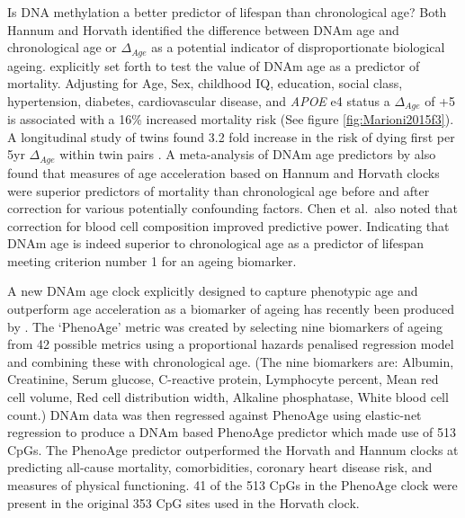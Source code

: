\documentclass[
]{book}
\begin{document}
Is DNA methylation a better predictor of lifespan than chronological age? Both Hannum and Horvath identified the difference between DNAm age and chronological age or \(\Delta_{Age}\) as a potential indicator of disproportionate biological ageing. \citet{Marioni2015} explicitly set forth to test the value of DNAm age as a predictor of mortality. Adjusting for Age, Sex, childhood IQ, education, social class, hypertension, diabetes, cardiovascular disease, and \emph{APOE} e4 status a \(\Delta_{Age}\) of +5 is associated with a 16\% increased mortality risk (See figure \ref{fig:Marioni2015f3}). A longitudinal study of twins found 3.2 fold increase in the risk of dying first per 5yr \(\Delta_{Age}\) within twin pairs \citep{Christiansen2016}. A meta-analysis of DNAm age predictors by \citet{Chen2016a} also found that measures of age acceleration based on Hannum and Horvath clocks were superior predictors of mortality than chronological age before and after correction for various potentially confounding factors. Chen et al.~also noted that correction for blood cell composition improved predictive power. Indicating that DNAm age is indeed superior to chronological age as a predictor of lifespan meeting criterion number 1 for an ageing biomarker.

A new DNAm age clock explicitly designed to capture phenotypic age and outperform age acceleration as a biomarker of ageing has recently been produced by \citet{Levine2018}. The `PhenoAge' metric was created by selecting nine biomarkers of ageing from 42 possible metrics using a proportional hazards penalised regression model and combining these with chronological age. (The nine biomarkers are: Albumin, Creatinine, Serum glucose, C-reactive protein, Lymphocyte percent, Mean red cell volume, Red cell distribution width, Alkaline phosphatase, White blood cell count.) DNAm data was then regressed against PhenoAge using elastic-net regression to produce a DNAm based PhenoAge predictor which made use of 513 CpGs. The PhenoAge predictor outperformed the Horvath and Hannum clocks at predicting all-cause mortality, comorbidities, coronary heart disease risk, and measures of physical functioning. 41 of the 513 CpGs in the PhenoAge clock were present in the original 353 CpG sites used in the Horvath clock.
\end{document}
